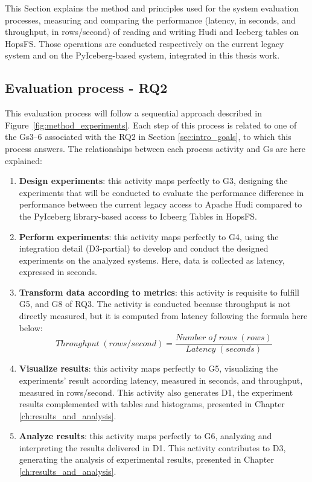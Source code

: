 This Section explains the method and principles used for the system evaluation processes, measuring and comparing the performance (latency, in seconds, and throughput, in rows/second) of reading and writing Hudi and Iceberg tables on \gls{HopsFS}. Those operations are conducted respectively on the current legacy system and on the PyIceberg-based system, integrated in this thesis work.

\subsection{Evaluation process - RQ2}
\label{subsec:eval_process_hudi_iceberg}
This evaluation process will follow a sequential approach described in Figure~\ref{fig:method_experiments}. Each step of this process is related to one of the \glspl{G}3--6 associated with the \gls{RQ}2 in Section \ref{sec:intro_goals}, to which this process answers. The relationships between each process activity and \glspl{G} are here explained:
\begin{enumerate}
    \item \textbf{Design experiments}: this activity maps perfectly to \gls{G}3, designing the experiments that will be conducted to evaluate the performance difference in performance between the current legacy access to Apache Hudi compared to the PyIceberg library-based access to Icbeerg Tables in \gls{HopsFS}. 
    \item \textbf{Perform experiments}: this activity maps perfectly to \gls{G}4, using the integration detail (\gls{D}3-partial) to develop and conduct the designed experiments on the analyzed systems. Here, data is collected as latency, expressed in seconds.
    \item \textbf{Transform data according to metrics}: this activity is requisite to fulfill \gls{G}5, and \gls{G}8 of \gls{RQ}3. The activity is conducted because throughput is not directly measured, but it is computed from latency following the formula here below:
    \[ Throughput \; (rows/second) = \frac{Number \; of \; rows \; (rows)}{Latency \;(seconds)}\]
    \item \textbf{Visualize results}: this activity maps perfectly to \gls{G}5, visualizing the experiments' result according latency, measured in seconds, and throughput, measured in rows/second. This activity also generates \gls{D}1, the experiment results complemented with tables and histograms, presented in Chapter \ref{ch:results_and_analysis}.
    \item \textbf{Analyze results}: this activity maps perfectly to \gls{G}6, analyzing and interpreting the results delivered in \gls{D}1. This activity contributes to \gls{D}3, generating the analysis of experimental results, presented in Chapter \ref{ch:results_and_analysis}.
\end{enumerate}
